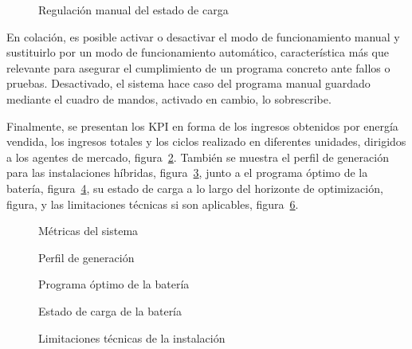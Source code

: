 \begin{figure}
  \centering
  \caption{Regulación manual del estado de carga}
  \label{fig:soc-manual}
\end{figure}

En colación, es posible activar o desactivar el modo de funcionamiento manual y sustituirlo por un modo de funcionamiento automático, característica más que relevante para asegurar el cumplimiento de un programa concreto ante fallos o pruebas. Desactivado, el sistema hace caso del programa manual guardado mediante el cuadro de mandos, activado en cambio, lo sobrescribe.

Finalmente, se presentan los KPI en forma de los ingresos obtenidos por energía vendida, los ingresos totales y los ciclos realizado en diferentes unidades, dirigidos a los agentes de mercado, figura~\ref{fig:kpi-sistema}. También se muestra el perfil de generación para las instalaciones híbridas, figura~\ref{fig:perfil-generación}, junto a el programa óptimo de la batería, figura~\ref{fig:programa-óptimo}, su estado de carga a lo largo del horizonte de optimización, figura, y las limitaciones técnicas si son aplicables, figura~\ref{fig:limitaciones-técnicas}.

\begin{figure}
  \centering
  \caption{Métricas del sistema}
  \label{fig:kpi-sistema}
\end{figure}

\begin{figure}
  \centering
  \caption{Perfil de generación}
  \label{fig:perfil-generación}
\end{figure}

\begin{figure}
  \centering
  \caption{Programa óptimo de la batería}
  \label{fig:programa-óptimo}
\end{figure}

\begin{figure}
  \centering
  \caption{Estado de carga de la batería}
  \label{fig:soc-bess}
\end{figure}

\begin{figure}
  \centering
  \caption{Limitaciones técnicas de la instalación}
  \label{fig:limitaciones-técnicas}
\end{figure}
